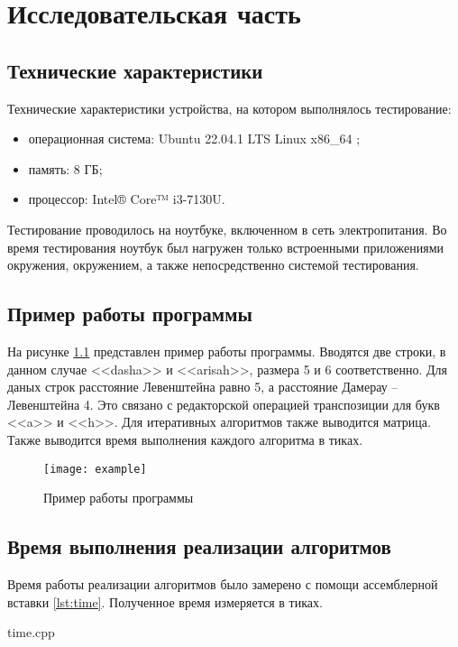 \chapter{Исследовательская часть}

\section{Технические характеристики}

Технические характеристики устройства, на котором выполнялось тестирование:
\begin{itemize}
	\item операционная система: Ubuntu 22.04.1 LTS Linux x86\_64 \cite{ubuntu};
	\item память: 8 ГБ;
	\item процессор: Intel® Core™ i3-7130U.
\end{itemize}

Тестирование проводилось на ноутбуке, включенном в сеть электропитания. Во время тестирования ноутбук был нагружен только встроенными приложениями окружения, окружением, а также непосредственно системой тестирования.

\section{Пример работы программы}

На рисунке \ref{img:example} представлен пример работы программы. Вводятся две строки, в данном случае <<dasha>> и <<arisah>>, размера 5 и 6 соответственно. Для даных строк расстояние Левенштейна равно 5, а расстояние Дамерау -- Левенштейна 4. Это связано с редакторской операцией транспозиции для букв <<a>> и <<h>>. Для итеративных алгоритмов также выводится матрица. Также выводится время выполнения каждого алгоритма в тиках.
\pagebreak 
\begin{figure}[h]
	\centering
	\texttt{[image: example]}
	\caption{Пример работы программы}
	\label{img:example}
\end{figure}

\section{Время выполнения реализации алгоритмов}

Время работы реализации алгоритмов было замерено с помощи ассемблерной вставки \ref{lst:time}. Полученное время измеряется в тиках.
\pagebreak
\begin{lstinputlisting}[
	caption={Ассемблерная вставка},
	label={lst:time}
	]{time.cpp}
\end{lstinputlisting}

